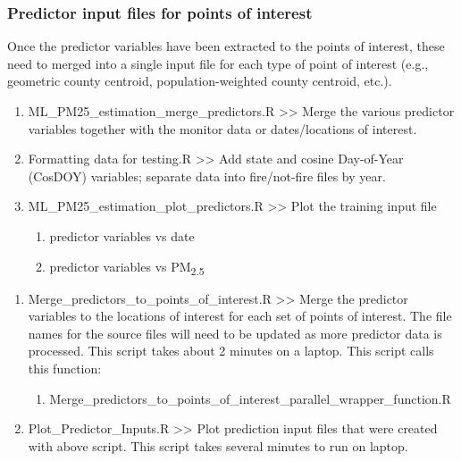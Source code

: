\subsubsection{Predictor input files for points of interest}

Once the predictor variables have been extracted to the points of interest, these need to merged into a single input file for each type of point of interest (e.g., geometric county centroid, population-weighted county centroid, etc.).

\begin{enumerate}

\item ML\_PM25\_estimation\_merge\_predictors.R >>  Merge the various predictor variables together with the monitor data or dates/locations of interest. %

\item Formatting data for testing.R >> Add state and cosine Day-of-Year (CosDOY) variables; separate data into fire/not-fire files by year.


\item ML\_PM25\_estimation\_plot\_predictors.R >> Plot the training input file %
	\begin{enumerate}
		\item predictor variables vs date
		\item predictor variables vs PM\textsubscript{2.5}
	\end{enumerate}

\end{enumerate}


\begin{enumerate}
\item Merge\_predictors\_to\_points\_of\_interest.R >> Merge the predictor variables to the locations of interest for each set of points of interest. The file names for the source files will need to be updated as more predictor data is processed. This script takes about 2 minutes on a laptop. This script calls this function:

	\begin{enumerate}
	\item Merge\_predictors\_to\_points\_of\_interest\_parallel\_wrapper\_function.R
	\end{enumerate}

\item Plot\_Predictor\_Inputs.R >> Plot prediction input files that were created with above script. This script takes several minutes to run on laptop. 

\end{enumerate}
